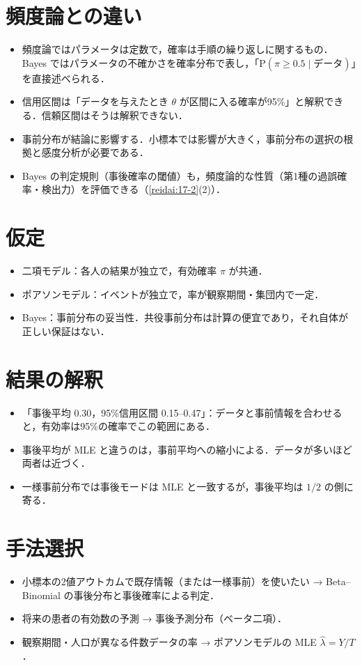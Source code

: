 \documentclass[a4paper,11pt,openany]{ltjsbook}
\newcommand{\Prob}{\mathrm{P}}
\begin{document}
\section{頻度論との違い}\label{sec:17-vs}
\begin{itemize}
\item 頻度論ではパラメータは定数で，確率は手順の繰り返しに関するもの．Bayes ではパラメータの不確かさを確率分布で表し，「$\Prob(\pi\ge0.5\mid\text{データ})$」を直接述べられる．
\item 信用区間は「データを与えたとき $\theta$ が区間に入る確率が95\%」と解釈できる．信頼区間はそうは解釈できない．
\item 事前分布が結論に影響する．小標本では影響が大きく，事前分布の選択の根拠と感度分析が必要である．
\item Bayes の判定規則（事後確率の閾値）も，頻度論的な性質（第1種の過誤確率・検出力）を評価できる（\cref{reidai:17-2}(2)）．
\end{itemize}

\section{仮定}\label{sec:17-assump}
\begin{itemize}
\item 二項モデル：各人の結果が独立で，有効確率 $\pi$ が共通．
\item ポアソンモデル：イベントが独立で，率が観察期間・集団内で一定．
\item Bayes：事前分布の妥当性．共役事前分布は計算の便宜であり，それ自体が正しい保証はない．
\end{itemize}

\section{結果の解釈}\label{sec:17-interp}
\begin{itemize}
\item 「事後平均 0.30，95\%信用区間 0.15--0.47」：データと事前情報を合わせると，有効率は95\%の確率でこの範囲にある．
\item 事後平均が MLE と違うのは，事前平均への縮小による．データが多いほど両者は近づく．
\item 一様事前分布では事後モードは MLE と一致するが，事後平均は $1/2$ の側に寄る．
\end{itemize}

\section{手法選択}\label{sec:17-choice}
\begin{itemize}
\item 小標本の2値アウトカムで既存情報（または一様事前）を使いたい → Beta--Binomial の事後分布と事後確率による判定．
\item 将来の患者の有効数の予測 → 事後予測分布（ベータ二項）．
\item 観察期間・人口が異なる件数データの率 → ポアソンモデルの MLE $\hat\lambda=Y/T$．
\end{itemize}
\end{document}
